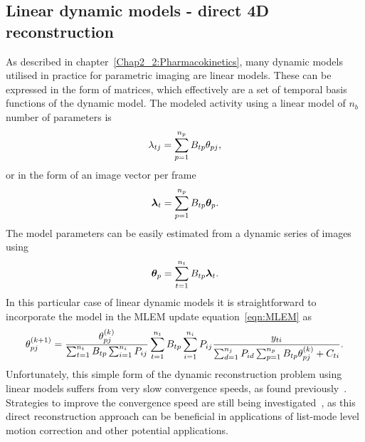 \subsection{Linear dynamic models - direct 4D reconstruction}
As described in chapter~\ref{Chap2_2:Pharmacokinetics}, many dynamic models utilised in practice for parametric imaging are linear models. These can be expressed in the form of matrices, which effectively are a set of temporal basis functions of the dynamic model.
The modeled activity using a linear model of $n_b$ number of parameters is
\begin{equation}
\lambda_{tj} = \sum_{p=1}^{n_p} B_{tp}   \theta_{pj} \\, 
\label{eqn:2_3_LinearBasis}
\end{equation}
or in the form of an image vector per frame
\begin{equation}
\bm\lambda_{t} = \sum_{p=1}^{n_p} B_{tp}  \bm\theta_{p}  \\.
\end{equation}
The model parameters can be easily estimated from a dynamic series of images using
\begin{equation}
\bm\theta_{p}  = \sum_{t=1}^{n_t} B_{tp} \bm\lambda_{t}  \\.
\end{equation}
In this particular case of linear dynamic models it is straightforward to incorporate the model in the MLEM update equation~\ref{eqn:MLEM} as
%
%
%
\begin{equation}
\theta_{pj}^{(k+1)} = \frac{\theta_{pj}^{(k)}}
{\sum_{t=1}^{n_t} B_{tp} \sum_{i=1}^{n_i} P_{ij}} 
\sum_{t=1}^{n_t} B_{tp} \sum_{i=1}^{n_i} P_{ij}
\frac{y_{ti}}
{\sum_{d=1}^{n_j} P_{id} \sum_{p=1}^{n_p} B_{tp}\theta_{pj}^{(k)} + C_{ti} } \\.
\label{eqn:4DMLEM}
\end{equation} 
%
Unfortunately, this simple form of the dynamic reconstruction problem using linear models suffers from very slow convergence speeds, as found previously~\cite{Carson1985,Matthews1995}. Strategies to improve the convergence speed are still being investigated~\cite{Gallezot2018}, as this direct reconstruction approach can be beneficial in applications of list-mode level motion correction and other potential applications.
%
